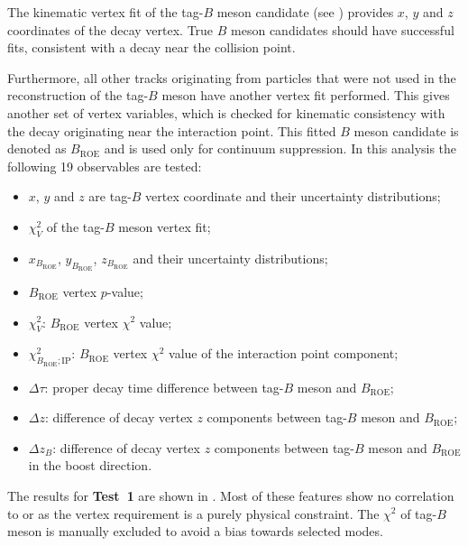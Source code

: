 The kinematic vertex fit of the tag-$B$ meson candidate (see ) provides $x$, $y$ and $z$ coordinates of the decay vertex.
True $B$ meson candidates should have successful fits, consistent with a decay near the collision point.

Furthermore, all other tracks originating from particles that were not used in the reconstruction of the tag-$B$ meson have another vertex fit performed.
This gives another set of vertex variables, which is checked for kinematic consistency with the decay originating near the interaction point.
This fitted $B$ meson candidate is denoted as $B_{\mathrm{ROE}}$ and is used only for continuum suppression.
In this analysis the following 19 observables are tested:
\begin{itemize}
    \item $x$, $y$ and $z$ are tag-$B$ vertex coordinate and their uncertainty distributions;
    \item $\chi_V^2$ of the tag-$B$ meson vertex fit;
    \item $x_{B_{\mathrm{ROE}}}$, $y_{B_{\mathrm{ROE}}}$, $z_{B_{\mathrm{ROE}}}$ and their uncertainty distributions;
    \item $B_{\mathrm{ROE}}$ vertex $p$-value;
    \item $\chi^2_{V}$: $B_{\mathrm{ROE}}$ vertex $\chi^2$ value;
    \item $\chi^2_{B_{\mathrm{ROE}};\mathrm{IP}}$: $B_{\mathrm{ROE}}$ vertex $\chi^2$ value of the interaction point component;
    \item $\Delta \tau$: proper decay time difference between tag-$B$ meson and $B_{\mathrm{ROE}}$;
    \item $\Delta z$: difference of decay vertex $z$ components between tag-$B$ meson and $B_{\mathrm{ROE}}$;
    \item $\Delta z_B$: difference of decay vertex $z$ components between tag-$B$ meson and $B_{\mathrm{ROE}}$ in the boost direction.
\end{itemize}

The results for \textbf{Test~1} are shown in .
Most of these features show no correlation to \EB or \Estar as the vertex requirement is a purely physical constraint.
The $\chi^2$ of tag-$B$ meson is manually excluded to avoid a bias towards selected \FEI modes.

